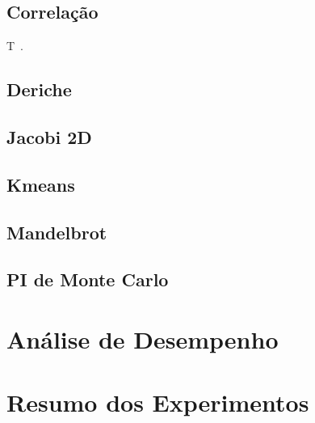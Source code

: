 \subsection{Correlação}\label{subsec:correlation}

T~\cite{morettin2010}.


\subsection{Deriche}\label{subsec:deriche}

\subsection{Jacobi 2D}\label{subsec:jacobi2d}

\subsection{Kmeans}\label{subsec:kmeans}

\subsection{Mandelbrot}\label{subsec:mandelbrot}

\subsection{PI de Monte Carlo}\label{subsec:pi}

\section{Análise de Desempenho}\label{sec:desempenho}

\section{Resumo dos Experimentos}\label{sec:resumo_exp}
